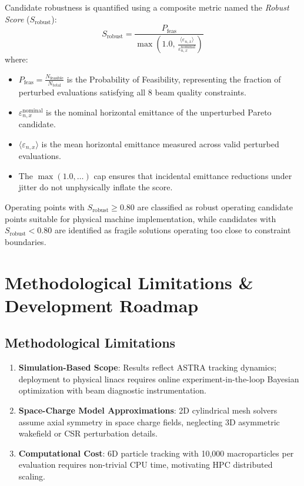 \documentclass[11pt,a4paper]{article}
\begin{document}
Candidate robustness is quantified using a composite metric named the \textit{Robust Score} ($S_{\text{robust}}$):
\begin{equation}
    S_{\text{robust}} = \frac{P_{\text{feas}}}{\max\left(1.0, \, \frac{\langle \varepsilon_{n,x} \rangle}{\varepsilon_{n,x}^{\text{nominal}}}\right)}
\end{equation}
where:
\begin{itemize}
    \item $P_{\text{feas}} = \frac{N_{\text{feasible}}}{N_{\text{total}}}$ is the Probability of Feasibility, representing the fraction of perturbed evaluations satisfying all 8 beam quality constraints.
    \item $\varepsilon_{n,x}^{\text{nominal}}$ is the nominal horizontal emittance of the unperturbed Pareto candidate.
    \item $\langle \varepsilon_{n,x} \rangle$ is the mean horizontal emittance measured across valid perturbed evaluations.
    \item The $\max(1.0, \dots)$ cap ensures that incidental emittance reductions under jitter do not unphysically inflate the score.
\end{itemize}

Operating points with $S_{\text{robust}} \ge 0.80$ are classified as robust operating candidate points suitable for physical machine implementation, while candidates with $S_{\text{robust}} < 0.80$ are identified as fragile solutions operating too close to constraint boundaries.


\section{Methodological Limitations \& Development Roadmap}
\label{sec:roadmap}

\subsection{Methodological Limitations}
\begin{enumerate}
    \item \textbf{Simulation-Based Scope}: Results reflect ASTRA tracking dynamics; deployment to physical linacs requires online experiment-in-the-loop Bayesian optimization with beam diagnostic instrumentation.
    \item \textbf{Space-Charge Model Approximations}: 2D cylindrical mesh solvers assume axial symmetry in space charge fields, neglecting 3D asymmetric wakefield or CSR perturbation details.
    \item \textbf{Computational Cost}: 6D particle tracking with 10,000 macroparticles per evaluation requires non-trivial CPU time, motivating HPC distributed scaling.
\end{enumerate}
\end{document}
